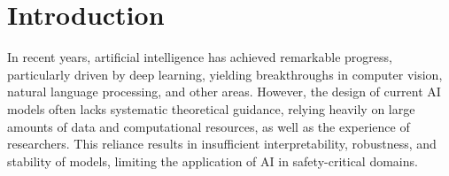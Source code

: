 \documentclass{article}
\theoremstyle{plain}
\theoremstyle{definition}
\theoremstyle{remark}
\begin{document}




% 
% 




\section{Introduction}
In recent years, artificial intelligence has achieved remarkable progress, particularly driven by deep learning, yielding breakthroughs in computer vision, natural language processing, and other areas. However, the design of current AI models often lacks systematic theoretical guidance, relying heavily on large amounts of data and computational resources, as well as the experience of researchers. This reliance results in insufficient interpretability, robustness, and stability of models, limiting the application of AI in safety-critical domains.
\end{document}
